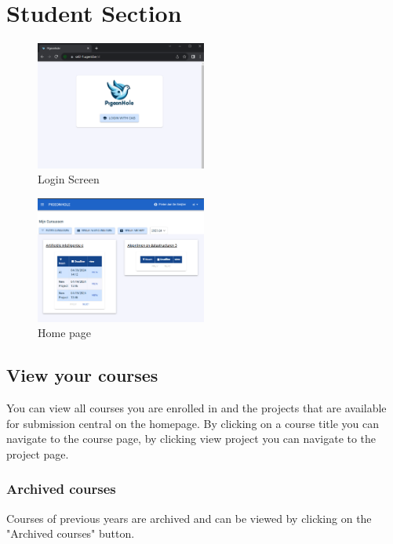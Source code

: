 \documentclass{article}
\begin{document}
\section{Student Section}

\begin{figure}[h]
    \centering
    \includegraphics[width=0.5\textwidth]{images/login.png}
    \caption{Login Screen}
    \label{fig:login}
\end{figure}

\begin{figure}[h]
    \centering
    \includegraphics[width=0.5\textwidth]{images/home_page.png}
    \caption{Home page}
    \label{fig:home_page}
\end{figure}

\subsection{View your courses}

You can view all courses you are enrolled in and the projects that are available for submission central on the homepage. By clicking on a course title you can navigate to the course page, by clicking view project you can navigate to the project page.

\subsubsection{Archived courses}
Courses of previous years are archived and can be viewed by clicking on the "Archived courses" button.
\end{document}
